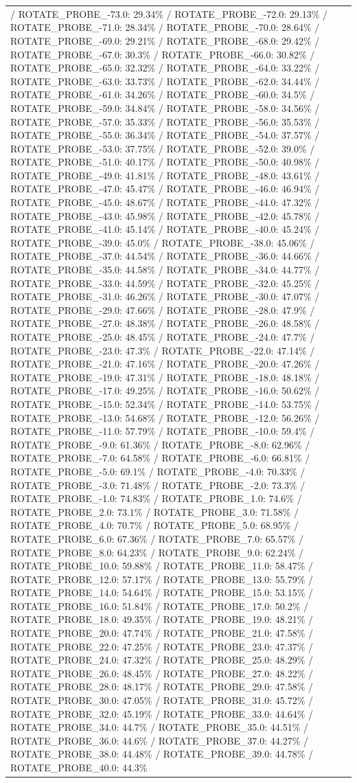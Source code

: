 \documentclass[parskip=half]{scrartcl}
\begin{document}
\begin{tabular}{l|l}
/ ROTATE_PROBE_-73.0: 29.34\% / ROTATE_PROBE_-72.0: 29.13\% / ROTATE_PROBE_-71.0: 28.34\% / ROTATE_PROBE_-70.0: 28.64\% / ROTATE_PROBE_-69.0: 29.21\% / ROTATE_PROBE_-68.0: 29.42\% / ROTATE_PROBE_-67.0: 30.3\% / ROTATE_PROBE_-66.0: 30.82\% / ROTATE_PROBE_-65.0: 32.32\% / ROTATE_PROBE_-64.0: 33.22\% / ROTATE_PROBE_-63.0: 33.73\% / ROTATE_PROBE_-62.0: 34.44\% / ROTATE_PROBE_-61.0: 34.26\% / ROTATE_PROBE_-60.0: 34.5\% / ROTATE_PROBE_-59.0: 34.84\% / ROTATE_PROBE_-58.0: 34.56\% / ROTATE_PROBE_-57.0: 35.33\% / ROTATE_PROBE_-56.0: 35.53\% / ROTATE_PROBE_-55.0: 36.34\% / ROTATE_PROBE_-54.0: 37.57\% / ROTATE_PROBE_-53.0: 37.75\% / ROTATE_PROBE_-52.0: 39.0\% / ROTATE_PROBE_-51.0: 40.17\% / ROTATE_PROBE_-50.0: 40.98\% / ROTATE_PROBE_-49.0: 41.81\% / ROTATE_PROBE_-48.0: 43.61\% / ROTATE_PROBE_-47.0: 45.47\% / ROTATE_PROBE_-46.0: 46.94\% / ROTATE_PROBE_-45.0: 48.67\% / ROTATE_PROBE_-44.0: 47.32\% / ROTATE_PROBE_-43.0: 45.98\% / ROTATE_PROBE_-42.0: 45.78\% / ROTATE_PROBE_-41.0: 45.14\% / ROTATE_PROBE_-40.0: 45.24\% / ROTATE_PROBE_-39.0: 45.0\% / ROTATE_PROBE_-38.0: 45.06\% / ROTATE_PROBE_-37.0: 44.54\% / ROTATE_PROBE_-36.0: 44.66\% / ROTATE_PROBE_-35.0: 44.58\% / ROTATE_PROBE_-34.0: 44.77\% / ROTATE_PROBE_-33.0: 44.59\% / ROTATE_PROBE_-32.0: 45.25\% / ROTATE_PROBE_-31.0: 46.26\% / ROTATE_PROBE_-30.0: 47.07\% / ROTATE_PROBE_-29.0: 47.66\% / ROTATE_PROBE_-28.0: 47.9\% / ROTATE_PROBE_-27.0: 48.38\% / ROTATE_PROBE_-26.0: 48.58\% / ROTATE_PROBE_-25.0: 48.45\% / ROTATE_PROBE_-24.0: 47.7\% / ROTATE_PROBE_-23.0: 47.3\% / ROTATE_PROBE_-22.0: 47.14\% / ROTATE_PROBE_-21.0: 47.16\% / ROTATE_PROBE_-20.0: 47.26\% / ROTATE_PROBE_-19.0: 47.31\% / ROTATE_PROBE_-18.0: 48.18\% / ROTATE_PROBE_-17.0: 49.25\% / ROTATE_PROBE_-16.0: 50.62\% / ROTATE_PROBE_-15.0: 52.34\% / ROTATE_PROBE_-14.0: 53.75\% / ROTATE_PROBE_-13.0: 54.68\% / ROTATE_PROBE_-12.0: 56.26\% / ROTATE_PROBE_-11.0: 57.79\% / ROTATE_PROBE_-10.0: 59.4\% / ROTATE_PROBE_-9.0: 61.36\% / ROTATE_PROBE_-8.0: 62.96\% / ROTATE_PROBE_-7.0: 64.58\% / ROTATE_PROBE_-6.0: 66.81\% / ROTATE_PROBE_-5.0: 69.1\% / ROTATE_PROBE_-4.0: 70.33\% / ROTATE_PROBE_-3.0: 71.48\% / ROTATE_PROBE_-2.0: 73.3\% / ROTATE_PROBE_-1.0: 74.83\% / ROTATE_PROBE_1.0: 74.6\% / ROTATE_PROBE_2.0: 73.1\% / ROTATE_PROBE_3.0: 71.58\% / ROTATE_PROBE_4.0: 70.7\% / ROTATE_PROBE_5.0: 68.95\% / ROTATE_PROBE_6.0: 67.36\% / ROTATE_PROBE_7.0: 65.57\% / ROTATE_PROBE_8.0: 64.23\% / ROTATE_PROBE_9.0: 62.24\% / ROTATE_PROBE_10.0: 59.88\% / ROTATE_PROBE_11.0: 58.47\% / ROTATE_PROBE_12.0: 57.17\% / ROTATE_PROBE_13.0: 55.79\% / ROTATE_PROBE_14.0: 54.64\% / ROTATE_PROBE_15.0: 53.15\% / ROTATE_PROBE_16.0: 51.84\% / ROTATE_PROBE_17.0: 50.2\% / ROTATE_PROBE_18.0: 49.35\% / ROTATE_PROBE_19.0: 48.21\% / ROTATE_PROBE_20.0: 47.74\% / ROTATE_PROBE_21.0: 47.58\% / ROTATE_PROBE_22.0: 47.25\% / ROTATE_PROBE_23.0: 47.37\% / ROTATE_PROBE_24.0: 47.32\% / ROTATE_PROBE_25.0: 48.29\% / ROTATE_PROBE_26.0: 48.45\% / ROTATE_PROBE_27.0: 48.22\% / ROTATE_PROBE_28.0: 48.17\% / ROTATE_PROBE_29.0: 47.58\% / ROTATE_PROBE_30.0: 47.05\% / ROTATE_PROBE_31.0: 45.72\% / ROTATE_PROBE_32.0: 45.19\% / ROTATE_PROBE_33.0: 44.64\% / ROTATE_PROBE_34.0: 44.7\% / ROTATE_PROBE_35.0: 44.51\% / ROTATE_PROBE_36.0: 44.6\% / ROTATE_PROBE_37.0: 44.27\% / ROTATE_PROBE_38.0: 44.48\% / ROTATE_PROBE_39.0: 44.78\% / ROTATE_PROBE_40.0: 44.3\% 
\end{tabular}
\end{document}
